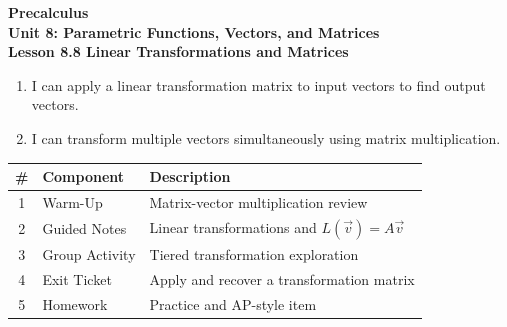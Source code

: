 \documentclass[10pt]{article}
\begin{document}
\vspace{-0.8in}

\begin{center}
  {\color{white}\textbf{\LARGE Precalculus}}\\[4pt]
  {\color{skymid}\large\textbf{Unit 8: Parametric Functions, Vectors, and Matrices}}\\[6pt]
  {\color{white}\textbf{\large Lesson 8.8 \quad Linear Transformations and Matrices}}
\end{center}

\vspace{0.22in}
\namedateperiod
\vspace{0.18in}

\begin{learningtargetbox}
\small
\begin{enumerate}[leftmargin=1.5em, itemsep=5pt]
  \item I can apply a linear transformation matrix to input vectors to find output vectors.
  \item I can transform multiple vectors simultaneously using matrix multiplication.
\end{enumerate}
\end{learningtargetbox}

\vspace{0.14in}

\begin{tocbox}
\small
\renewcommand{\arraystretch}{1.5}
\begin{tabularx}{\linewidth}{@{} c l X @{}}
\rowcolor{sky}
\textbf{\#} & \textbf{Component} & \textbf{Description} \\
\midrule
1 & Warm-Up        & Matrix-vector multiplication review \\
2 & Guided Notes   & Linear transformations and $L(\vec{v})=A\vec{v}$ \\
3 & Group Activity & Tiered transformation exploration \\
4 & Exit Ticket    & Apply and recover a transformation matrix \\
5 & Homework       & Practice and AP-style item \\
\end{tabularx}
\end{tocbox}
\end{document}

